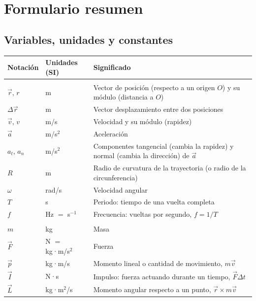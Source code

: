 \documentclass[11pt,a4paper]{article}
\begin{document}
\newpage
\section{Formulario resumen}
\subsection*{Variables, unidades y constantes}
\begin{center}\small
\renewcommand{\arraystretch}{1.15}
\begin{tabular}{|>{\centering\arraybackslash}p{2.3cm}|>{\centering\arraybackslash}p{3cm}|>{\raggedright\arraybackslash}p{9.4cm}|}
\hline
\textbf{Notación} & \textbf{Unidades (SI)} & \textbf{Significado}\\ \hline
\multicolumn{3}{|l|}{\textit{Cinemática}}\\ \hline
$\vec r$, $r$ & m & Vector de posición (respecto a un origen $O$) y su módulo (distancia a $O$)\\ \hline
$\Delta\vec r$ & m & Vector desplazamiento entre dos posiciones\\ \hline
$\vec v$, $v$ & m/s & Velocidad y su módulo (rapidez)\\ \hline
$\vec a$ & m/s$^2$ & Aceleración\\ \hline
$a_t$, $a_n$ & m/s$^2$ & Componentes tangencial (cambia la rapidez) y normal (cambia la dirección) de $\vec a$\\ \hline
$R$ & m & Radio de curvatura de la trayectoria (o radio de la circunferencia)\\ \hline
$\omega$ & rad/s & Velocidad angular\\ \hline
$T$ & s & Periodo: tiempo de una vuelta completa\\ \hline
$f$ & Hz $=$ s$^{-1}$ & Frecuencia: vueltas por segundo, $f=1/T$\\ \hline
\multicolumn{3}{|l|}{\textit{Dinámica}}\\ \hline
$m$ & kg & Masa\\ \hline
$\vec F$ & N $=$ kg·m/s$^2$ & Fuerza\\ \hline
$\vec p$ & kg·m/s & Momento lineal o cantidad de movimiento, $m\vec v$\\ \hline
$\vec I$ & N·s & Impulso: fuerza actuando durante un tiempo, $\vec F\Delta t$\\ \hline
$\vec L$ & kg·m$^2$/s & Momento angular respecto a un punto, $\vec r\times m\vec v$\\ \hline

\end{tabular}
\end{center}
\end{document}

